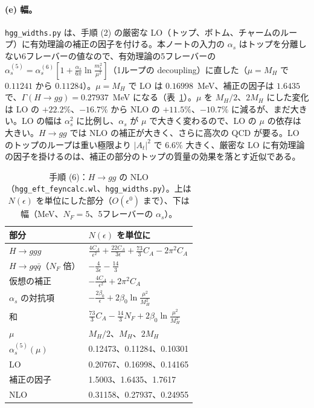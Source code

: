 \documentclass[a4paper,10pt]{ltjsarticle}
\begin{document}
\paragraph{(e) 幅。}\texttt{hgg\_widths.py} は、手順 (2) の厳密な LO（トップ、ボトム、チャームのループ）に有効理論の補正の因子を付ける。本ノートの入力の $\alpha_s$ はトップを分離しない6フレーバーの値なので、有効理論の5フレーバーの $\alpha_s^{(5)}=\alpha_s^{(6)}[1+\frac{\alpha_s}{6\pi}\ln\frac{m_t^2}{\mu^2}]$（1ループの decoupling）に直した（$\mu=M_H$ で $0.11241$ から $0.11284$）。$\mu=M_H$ で LO は $0.16998$~MeV、補正の因子は $1.6435$ で、$\Gamma(H\to gg)=0.27937$~MeV になる（表~\ref{tab:hgg}）。$\mu$ を $M_H/2$、$2M_H$ にした変化は LO の $+22.2\%$、$-16.7\%$ から NLO の $+11.5\%$、$-10.7\%$ に減るが、まだ大きい。LO の幅は $\alpha_s^2$ に比例し、$\alpha_s$ が $\mu$ で大きく変わるので、LO の $\mu$ の依存は大きい。$H\to gg$ では NLO の補正が大きく、さらに高次の QCD が要る。LO のトップのループは重い極限より $|A_t|^2$ で $6.6\%$ 大きく、厳密な LO に有効理論の因子を掛けるのは、補正の部分のトップの質量の効果を落とす近似である。

\begin{table}[tbp]
\centering\small
\caption{手順 (6)：$H\to gg$ の NLO（\texttt{hgg\_eft\_feyncalc.wl}、\texttt{hgg\_widths.py}）。上は $N(\epsilon)$ を単位にした部分（$O(\epsilon^0)$ まで）、下は幅（MeV、$N_F=5$、5フレーバーの $\alpha_s$）。}
\label{tab:hgg}
\begin{tabular}{ll}
\toprule
部分 & $N(\epsilon)$ を単位に \\
\midrule
$H\to ggg$ & $\frac{4C_A}{\epsilon^2}+\frac{22C_A}{3\epsilon}+\frac{73}3C_A-2\pi^2C_A$ \\
$H\to gq\bar q$（$N_F$ 倍） & $-\frac4{3\epsilon}-\frac{14}3$ \\
仮想の補正 & $-\frac{4C_A}{\epsilon^2}+2\pi^2C_A$ \\
$\alpha_s$ の対抗項 & $-\frac{2\beta_0}\epsilon+2\beta_0\ln\frac{\mu^2}{M_H^2}$ \\
和 & $\frac{73}3C_A-\frac{14}3N_F+2\beta_0\ln\frac{\mu^2}{M_H^2}$ \\
\midrule
$\mu$ & $M_H/2$、$M_H$、$2M_H$ \\
$\alpha_s^{(5)}(\mu)$ & 0.12473、0.11284、0.10301 \\
LO & 0.20767、0.16998、0.14165 \\
補正の因子 & 1.5003、1.6435、1.7617 \\
NLO & 0.31158、0.27937、0.24955 \\
\bottomrule
\end{tabular}
\end{table}
\end{document}
